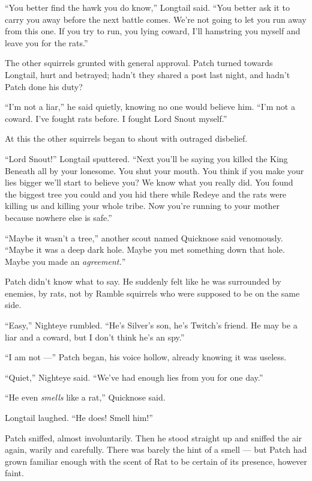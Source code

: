 \documentclass[ebook,oneside,openany,17pt]{memoir}
\newenvironment{tolerant}[1]{%
  \par\tolerance=#1\relax
}{%
  \par
}
\begin{document}
“You better find the hawk you do know,” Longtail said. “You better ask
it to carry you away before the next battle comes. We’re not going to
let you run away from this one. If you try to run, you lying coward,
I’ll hamstring you myself and leave you for the rats.”

\begin{tolerant}{2000}
The other squirrels grunted with general approv\-al. Patch turned
towards Longtail, hurt and betrayed; hadn’t they shared a post last
night, and hadn’t Patch done his duty?
\end{tolerant}

“I’m not a liar,” he said quietly, knowing no one would believe
him. “I’m not a coward. I’ve fought rats before. I fought Lord Snout
myself.”

At this the other squirrels began to shout with outraged disbelief.

“Lord Snout!” Longtail sputtered. “Next you’ll be saying you killed
the King Beneath all by your lonesome. You shut your mouth. You think
if you make your lies bigger we’ll start to believe you? We know what
you really did. You found the biggest tree you could and you hid there
while Redeye and the rats were killing us and killing your whole
tribe. Now you’re running to your mother because nowhere else is
safe.”

\begin{tolerant}{500}
“Maybe it wasn’t a tree,” another scout named Quicknose said
venomously. “Maybe it was a deep dark hole. Maybe you met something
down that hole. Maybe you made an \emph{agreement.}”
\end{tolerant}

Patch didn’t know what to say. He suddenly felt like he was surrounded
by enemies, by rats, not by Ramble squirrels who were supposed to be
on the same side.

“Easy,” Nighteye rumbled. “He’s Silver’s son, he’s Twitch’s friend. He
may be a liar and a coward, but I don’t think he’s an spy.”

“I am not —” Patch began, his voice hollow, already knowing it was
useless.

“Quiet,” Nighteye said. “We’ve had enough lies from you for one day.”

“He even \emph{smells} like a rat,” Quicknose said.

Longtail laughed. “He does! Smell him!”

\begin{tolerant}{1000}
Patch sniffed, almost involuntarily. Then he stood straight up and
sniffed the air again, warily and carefully. There was barely the hint
of a smell — but Patch had grown familiar enough with the scent of Rat
to be certain of its presence, however faint.
\end{tolerant}
\end{document}
